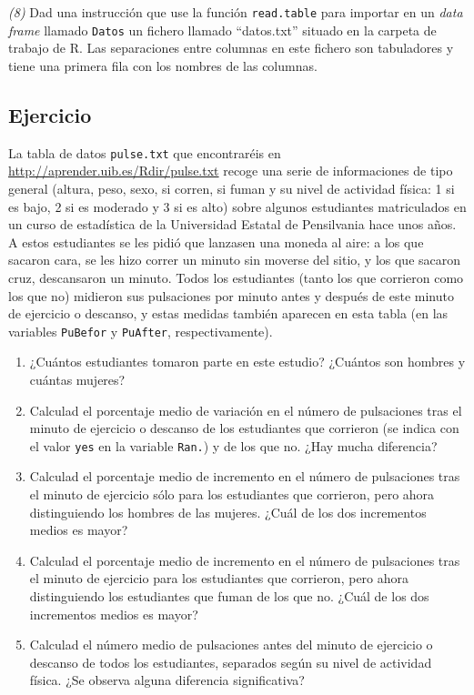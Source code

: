 \documentclass[
]{book}
\theoremstyle{definition}
\theoremstyle{definition}
\theoremstyle{definition}
\theoremstyle{remark}
\begin{document}
\emph{(8)} Dad una instrucción que use la función \texttt{read.table} para importar en un \emph{data frame} llamado \texttt{Datos} un fichero llamado ``datos.txt'' situado en la carpeta de trabajo de R. Las separaciones entre columnas en este fichero son tabuladores y tiene una primera fila con los nombres de las columnas.

\hypertarget{ejercicio-4}{%
\subsection*{Ejercicio}\label{ejercicio-4}}

La tabla de datos \texttt{pulse.txt} que encontraréis en \url{http://aprender.uib.es/Rdir/pulse.txt} recoge una serie de informaciones de tipo general (altura, peso, sexo, si corren, si fuman y su nivel de actividad física: 1 si es bajo, 2 si es moderado y 3 si es alto) sobre algunos estudiantes matriculados en un curso de estadística de la Universidad Estatal de Pensilvania hace unos años. A estos estudiantes se les pidió que lanzasen una moneda al aire: a los que sacaron cara, se les hizo correr un minuto sin moverse del sitio, y los que sacaron cruz, descansaron un minuto. Todos los estudiantes (tanto los que corrieron como los que no) midieron sus pulsaciones por minuto antes y después de este minuto de ejercicio o descanso, y estas medidas también aparecen en esta tabla (en las variables \texttt{PuBefor} y \texttt{PuAfter}, respectivamente).

\begin{enumerate}
\def\labelenumi{\alph{enumi}.}
\item
  ¿Cuántos estudiantes tomaron parte en este estudio? ¿Cuántos son hombres y cuántas mujeres?
\item
  Calculad el porcentaje medio de variación en el número de pulsaciones tras el minuto de ejercicio o descanso de los estudiantes que corrieron (se indica con el valor \texttt{yes} en la variable \texttt{Ran.}) y de los que no. ¿Hay mucha diferencia?
\item
  Calculad el porcentaje medio de incremento en el número de pulsaciones tras el minuto de ejercicio sólo para los estudiantes que corrieron, pero ahora distinguiendo los hombres de las mujeres. ¿Cuál de los dos incrementos medios es mayor?
\item
  Calculad el porcentaje medio de incremento en el número de pulsaciones tras el minuto de ejercicio para los estudiantes que corrieron, pero ahora distinguiendo los estudiantes que fuman de los que no. ¿Cuál de los dos incrementos medios es mayor?
\item
  Calculad el número medio de pulsaciones antes del minuto de ejercicio o descanso de todos los estudiantes, separados según su nivel de actividad física. ¿Se observa alguna diferencia significativa?
\end{enumerate}
\end{document}

